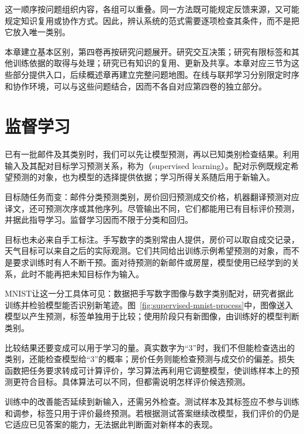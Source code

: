 这一顺序按问题组织内容，各组可以重叠。同一方法既可能规定反馈来源，又可能规定知识复用或协作方式。因此，辨认系统的范式需要逐项检查其条件，而不是把它放入唯一类别。

本章建立基本区别，第四卷再按研究问题展开。研究交互决策；研究有限标签和其他训练依据的取得与处理；研究已有知识的复用、更新及共享。本章对应三节为这些部分提供入口，后续概述章再建立完整问题地图。在线与联邦学习分别限定时序和协作环境，可以与这些问题结合，因而不各自对应第四卷的独立部分。

\section{监督学习}
\label{sec:supervised-learning}

已有一批邮件及其类别时，我们可以先让模型预测，再以已知类别检查结果。利用输入及其配对目标学习预测关系，称为（supervised learning）。配对示例既规定希望预测的对象，也为模型的选择提供依据；学习所得关系随后用于新输入。

目标随任务而变：邮件分类预测类别，房价回归预测成交价格，机器翻译预测对应译文，还可预测次序或其他序列。尽管输出不同，它们都能用已有目标评价预测，并据此指导学习。监督学习因而不限于分类和回归。

目标也未必来自手工标注。手写数字的类别常由人提供，房价可以取自成交记录，天气目标可以来自之后的实际观测。它们共同给出训练示例希望预测的对象，而不是要求训练时有人不断干预。面对待预测的新邮件或房屋，模型使用已经学到的关系，此时不能再把未知目标作为输入。

MNIST让这一分工具体可见：数据把手写数字图像与数字类别配对，研究者据此训练并检验模型能否识别新笔迹。图~\ref{fig:supervised-mnist-process}中，图像送入模型以产生预测，标签单独用于比较；使用阶段只有新图像，由训练好的模型判断类别。

比较结果还要变成可以用于学习的量。真实数字为“3”时，我们不但能检查选出的类别，还能检查模型给“3”的概率；房价任务则能检查预测与成交价的偏差。损失函数把任务要求转成可计算评价，学习算法再利用它调整模型，使训练样本上的预测更符合目标。具体算法可以不同，但都需说明怎样评价候选预测。

训练中的改善能否延续到新输入，还需另外检查。测试样本及其标签应不参与训练和调参，标签只用于评价最终预测。若根据测试答案继续改模型，我们评价的仍是它适应已见答案的能力，无法据此判断面对新样本的表现。

